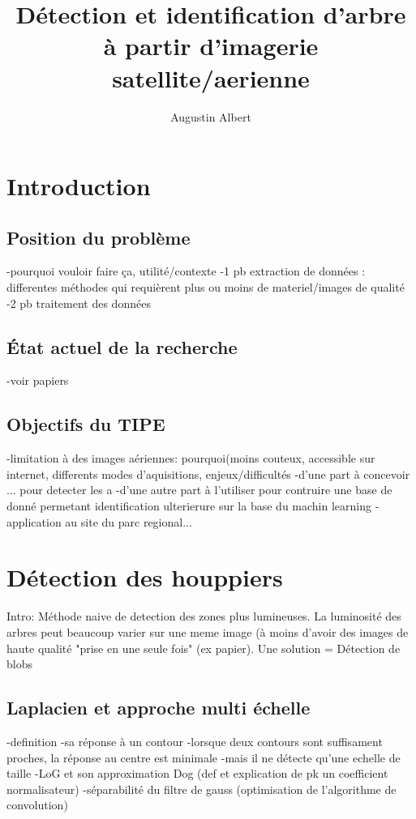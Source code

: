 \documentclass{article}
\title{Détection et identification d'arbre à partir d'imagerie satellite/aerienne}
\author{Augustin Albert}
\begin{document}
\maketitle
\tableofcontents

\section*{Introduction}
	\subsection*{Position du problème}
		-pourquoi vouloir faire ça, utilité/contexte	
		-1 pb extraction de données : differentes méthodes qui requièrent plus ou moins de materiel/images de qualité
		-2 pb traitement des données

	\subsection*{\'{E}tat actuel de la recherche}
		-voir papiers 

	\subsection*{Objectifs du TIPE}		
		-limitation à des images aériennes: pourquoi(moins couteux, accessible sur internet, differents modes d'aquisitions,  enjeux/difficultés
		-d'une part à concevoir ... pour detecter les a
		-d'une autre part à l'utiliser pour contruire une base de donné permetant identification ulterierure sur la base du machin learning
		-application au site du parc regional...
		
\section{Détection des houppiers}
	Intro: Méthode naive de detection des zones plus lumineuses. La luminosité des arbres peut beaucoup varier sur une meme image (à moins d'avoir des images de haute qualité "prise en une seule fois" (ex papier). Une solution = Détection de blobs 

	\subsection{Laplacien et approche multi échelle}
		-definition
		-sa réponse à un contour 
		-lorsque deux contours sont suffisament proches, la réponse au centre est minimale
		-mais  il ne détecte qu'une echelle de taille 
		-LoG et son approximation Dog (def et explication de pk un coefficient normalisateur)  
		-séparabilité du filtre de gauss (optimisation de l'algorithme de convolution)
	
\end{document}
